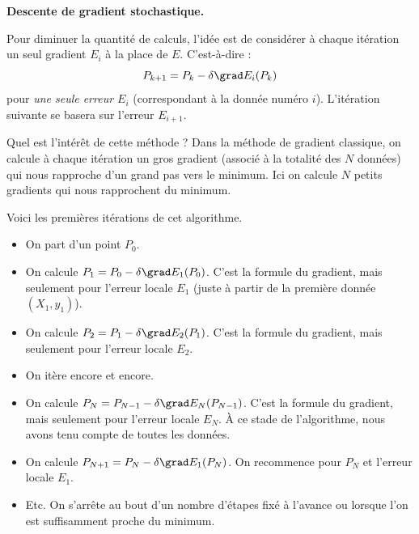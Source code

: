 \documentclass[11pt,class=report,crop=false]{standalone}
\begin{document}
\textbf{Descente de gradient stochastique.}

Pour diminuer la quantité de calculs, l'idée est de considérer à chaque itération un seul gradient $E_i$ à la place de $E$. C'est-à-dire : 
$$P_{k+1} = P_k - \delta \grad E_i (P_k)$$
pour \emph{une seule erreur $E_i$} (correspondant à la donnée numéro $i$).
L'itération suivante se basera sur l'erreur $E_{i+1}$.


Quel est l'intérêt de cette méthode ? 
Dans la méthode de gradient classique, on calcule à chaque itération un \og{}gros\fg{} gradient (associé à la totalité des $N$ données) qui nous rapproche d'un grand pas vers le minimum.
Ici on calcule $N$ \og{}petits\fg{} gradients qui nous rapprochent du minimum.%





Voici les premières itérations de cet algorithme.
\begin{itemize}
  \item On part d'un point $P_0$.
  
  \item On calcule $P_1 = P_0 - \delta \grad E_1 (P_0)$. C'est la formule du gradient, mais seulement pour l'erreur locale $E_1$ (juste à partir de la première donnée $(X_1,y_1)$).
  
  \item On calcule $P_2 = P_1 - \delta \grad E_2 (P_1)$. C'est la formule du gradient, mais seulement pour l'erreur locale $E_2$.
  
  \item On itère encore et encore.
  
  \item On calcule $P_{N} = P_{N-1} - \delta \grad E_N (P_{N-1})$. C'est la formule du gradient, mais seulement pour l'erreur locale $E_N$. À ce stade de l'algorithme, nous avons tenu compte de toutes les données. 
  
  \item On calcule $P_{N+1} = P_{N} - \delta \grad E_1 (P_{N})$. On recommence pour $P_N$ et l'erreur locale $E_1$.
  
  \item Etc. On s'arrête au bout d'un nombre d'étapes fixé à l'avance ou lorsque l'on est suffisamment proche du minimum.   
\end{itemize}
\end{document}
